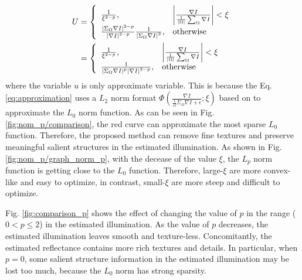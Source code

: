 \begin{align}
U &= \left \{
	\begin{array}{ll}
	\frac{1}{\xi^{2-p}}, 
	& \left |\frac{\nabla{I}}{\frac{1}{|\Omega|} \sum_{\Omega} \nabla{I} } \right| < \xi\\
	\frac{\left |\Sigma_{\Omega} \nabla{I} \right|^{2-p}}{\left |\nabla{I} \right|^{2-p}} \frac{1}{\left |\Sigma_{\Omega} \nabla{I} \right|^{2}},
	& \rm{otherwise}
	\end{array}
\right.\\
  &= \left \{
  	\begin{array}{ll}
  	\frac{1}{\xi^{2-p}}, 
  	& \left |\frac{\nabla{I}}{\frac{1}{|\Omega|} \sum_{\Omega} \nabla{I} } \right| < \xi\\
  	\frac{1}{\left |\Sigma_{\Omega} \nabla{I} \right|^{p} \left |\nabla{I} \right|^{2-p}},
  	& \rm{otherwise}
  	\end{array}
\right. \label{eq:lp_shape}
\end{align}
where the variable $u$ is only approximate variable. This is because the Eq. \ref{eq:approximation} uses a $L_{2}$ norm format $\Phi(\frac{\nabla{I}}{\frac{1}{\Omega}\Sigma_{\Omega}\nabla{I}+\epsilon};\xi)$ based on \cite{l0-sparse} to approximate the $L_{0} $ norm function. As can be seen in Fig. \ref{fig:nom_p/comparison}, the red curve can approximate the most sparse $L_{0}$ function. Therefore, the proposed method can remove fine textures and preserve meaningful salient structures in the estimated illumination. As shown in Fig. \ref{fig:nom_p/graph_norm_p}, with the decease of the value $\xi$, the $L_{p}$ norm function is getting close to the $L_{0}$ function. Therefore, large-$\xi$ are more convex-like and easy to optimize, in contrast, small-$\xi$ are more steep and difficult to optimize.\par
Fig. \ref{fig:comparison_p} shows the effect of changing the value of $p$ in the range ($0 < p \leq 2$) in the estimated illumination. As the value of $p$ decreases, the estimated illumination leaves smooth and texture-less. Concomitantly, the estimated reflectance contains more rich textures and details. In particular, when $p=0$, some salient structure information in the estimated illumination may be lost too much, because the $L_{0}$ norm has strong sparsity. 
